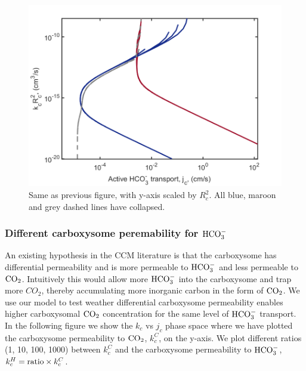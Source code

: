 \documentclass[]{article}
\begin{document}
\begin{figure}
	\includegraphics[width = \textwidth]{Rc_jcvskc_scaled.png}
	\caption{Same as previous figure, with y-axis scaled by $R_c^2$. All blue, maroon and grey dashed lines have collapsed.}
\end{figure}

\subsubsection{Different carboxysome peremability for ${\rm HCO_3^-}$}
An existing hypothesis in the CCM literature is that the carboxysome has differential permeability and is more permeable to ${\rm HCO_3^-}$ and less permeable to ${\rm CO_2}$. Intuitively this would allow more ${\rm HCO_3^-}$ into the carboxysome and trap more ${CO_2}$, thereby accumulating more inorganic carbon in the form of ${\rm CO_2}$. We use our model to test weather differential carboxysome permeability enables higher carboxysomal ${\rm CO_2}$ concentration for the same level of ${\rm HCO_3^-}$ transport. In the following figure we show the $k_c$ vs $j_c$ phase space where we have plotted the carboxysome permeability to ${\rm CO_2}$, $k_c^C$, on the y-axis. We plot different ratios (1, 10, 100, 1000) between $k_c^C$ and the carboxysome permeability to ${\rm HCO_3^-}$, $k_c^H = {\rm ratio} \times k_c^C$. 
\end{document}
